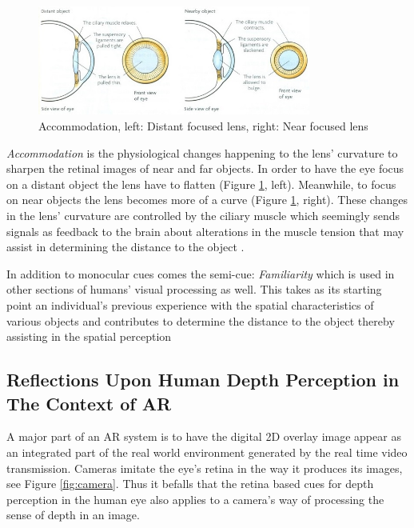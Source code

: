\begin{figure}[h!]
   \centering
   \includegraphics[width=0.8\textwidth]{figures/cue10.jpg}
   \caption{Accommodation, left: Distant focused lens, right: Near focused lens \cite{Biology2014}}\label{fig:cue10}
\end{figure}

\textit{Accommodation} is the physiological changes happening to the lens’ curvature to sharpen the retinal images of near and far objects. In order to have the eye focus on a distant object the lens have to flatten (Figure \ref{fig:cue10}, left). Meanwhile, to focus on near objects the lens becomes more of a curve (Figure \ref{fig:cue10}, right). These changes in the lens’ curvature are controlled by the ciliary muscle which seemingly sends signals as feedback to the brain about alterations in the muscle tension that may assist in determining the distance to the object \cite{Gale}.

In addition to monocular cues comes the semi-cue: \textit{Familiarity} which is used in other sections of humans’ visual processing as well. This takes as its starting point an individual’s previous experience with the spatial characteristics of various objects and contributes to determine the distance to the object thereby assisting in the spatial perception \cite{Gale}



\subsection{Reflections Upon Human Depth Perception in The Context of AR}
A major part of an AR system is to have the digital 2D overlay image appear as an integrated part of the real world environment generated by the real time video transmission. Cameras imitate the eye’s retina in the way it produces its images, see Figure \ref{fig:camera}. Thus it befalls that the retina based cues for depth perception in the human eye also applies to a camera’s way of processing the sense of depth in an image.

